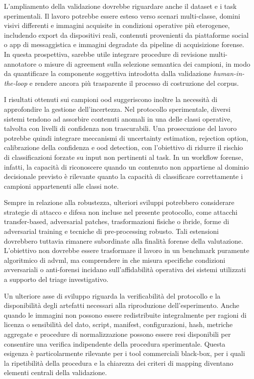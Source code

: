 L'ampliamento della validazione dovrebbe riguardare anche il dataset e i task
sperimentali. Il lavoro potrebbe essere esteso verso scenari multi-classe,
domini visivi differenti e immagini acquisite in condizioni operative più
eterogenee, includendo export da dispositivi reali, contenuti provenienti da
piattaforme social o app di messaggistica e immagini degradate da pipeline di
acquisizione forense. In questa prospettiva, sarebbe utile integrare procedure
di revisione multi-annotatore o misure di agreement sulla selezione semantica
dei campioni, in modo da quantificare la componente soggettiva introdotta dalla
validazione \textit{human-in-the-loop} e rendere ancora più trasparente il
processo di costruzione del corpus.

I risultati ottenuti sui campioni \gls{ood} suggeriscono inoltre la necessità di
approfondire la gestione dell'incertezza. Nel protocollo sperimentale, diversi
sistemi tendono ad assorbire contenuti anomali in una delle classi operative,
talvolta con livelli di confidenza non trascurabili. Una prosecuzione del lavoro
potrebbe quindi integrare meccanismi di uncertainty estimation, rejection option,
calibrazione della confidenza e \gls{ood} detection, con l'obiettivo di ridurre
il rischio di classificazioni forzate su input non pertinenti al task. In un
workflow forense, infatti, la capacità di riconoscere quando un contenuto non
appartiene al dominio decisionale previsto è rilevante quanto la capacità di
classificare correttamente i campioni appartenenti alle classi note.

Sempre in relazione alla robustezza, ulteriori sviluppi potrebbero considerare
strategie di attacco e difesa non incluse nel presente protocollo, come attacchi
transfer-based, adversarial patches, trasformazioni fisiche o ibride, forme di
adversarial training e tecniche di pre-processing robusto. Tali estensioni
dovrebbero tuttavia rimanere subordinate alla finalità forense della valutazione.
L'obiettivo non dovrebbe essere trasformare il lavoro in un benchmark puramente
algoritmico di \gls{advml}, ma comprendere in che misura specifiche condizioni
avversariali o anti-forensi incidano sull'affidabilità operativa dei sistemi
utilizzati a supporto del triage investigativo.

Un ulteriore asse di sviluppo riguarda la verificabilità del protocollo e la
disponibilità degli artefatti necessari alla riproduzione dell'esperimento.
Anche quando le immagini non possono essere redistribuite integralmente per
ragioni di licenza o sensibilità del dato, script, manifest, configurazioni,
hash, metriche aggregate e procedure di normalizzazione possono essere resi
disponibili per consentire una verifica indipendente della procedura
sperimentale. Questa esigenza è particolarmente rilevante per i tool commerciali
black-box, per i quali la ripetibilità della procedura e la chiarezza dei criteri
di mapping diventano elementi centrali della validazione.


